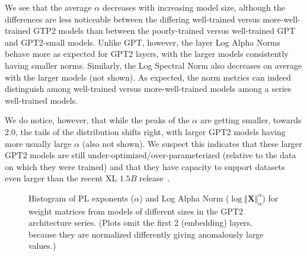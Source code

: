 We see that the average $\alpha$ decreases with increasing model size, although the differences are less noticeable between the differing well-trained versus more-well-trained GTP2 models than between the poorly-trained versus well-trained GPT and GPT2-small models.
Unlike GPT, however, the layer Log Alpha Norms behave more as expected for GPT2 layers, with the larger models consistently having smaller norms. 
Similarly, the Log Spectral Norm also decreases on average with the larger models (not shown).  
As expected, the norm metrics can indeed distinguish among well-trained versus more-well-trained models among a series well-trained models.

We do notice, however, that while the peaks of the $\alpha$ are getting smaller, towards $2.0$, the tails of the distribution shifts right, with larger GPT2 models having more usually large $\alpha$ (also not shown).  
We suspect this indicates that these larger GPT2 models are still under-optimized/over-parameterized (relative to the data on which they were trained) and that they have capacity to support datasets even larger than the recent XL $1.5B$ release~\cite{gpt2-xl}.

\begin{figure}[htb]
    \centering

    \quad
    \caption{Histogram of PL exponents ($\alpha$)
              and Log Alpha Norm ($\log\Vert\mathbf{X}\Vert_{\alpha}^{\alpha}$) for weight matrices from models of different sizes in the GPT2 architecture series.  (Plots omit the first 2 (embedding) layers, because they are normalized differently giving anomalously large values.)
             }
    \label{fig:gpt2-histograms}
\end{figure}
